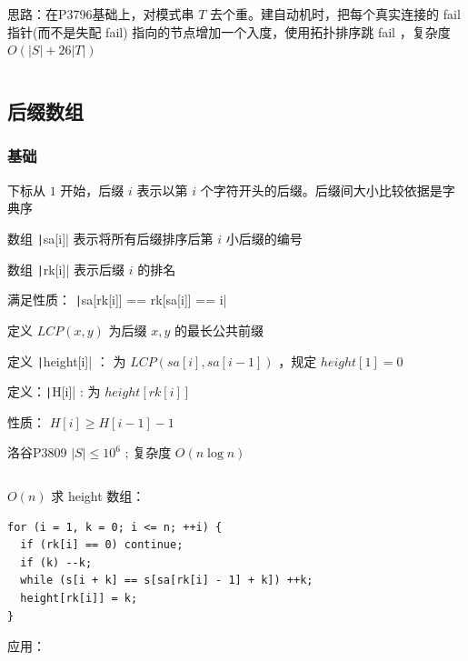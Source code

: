 \documentclass[twocolumn,10pt]{ctexart}
\begin{document}
思路：在P3796基础上，对模式串 $T$ 去个重。建自动机时，把每个真实连接的 fail 指针(而不是失配 fail) 指向的节点增加一个入度，使用拓扑排序跳 fail ，复杂度 $O(|S|+26|T|)$

\inputminted{cpp}{code/p5357_ac_automaton.cpp}

\subsection{后缀数组}

\subsubsection{基础}

下标从 $1$ 开始，后缀 $i$ 表示以第 $i$ 个字符开头的后缀。后缀间大小比较依据是字典序

数组 \texttt|sa[i]| 表示将所有后缀排序后第 $i$ 小后缀的编号

数组 \texttt|rk[i]| 表示后缀 $i$ 的排名

满足性质： \texttt|sa[rk[i]] == rk[sa[i]] == i|

定义 $LCP(x,y)$ 为后缀 $x,y$ 的最长公共前缀

定义 \texttt|height[i]| ： 为 $LCP(sa[i],sa[i-1])$ ，规定 $height[1]=0$

定义：\texttt|H[i]| : 为 $height[rk[i]]$

性质： $H[i]\ge H[i-1]-1$

洛谷P3809 $|S|\le10^6$ ; 复杂度 $O(n\log n)$

\inputminted{cpp}{code/p3809_suffix_array.cpp}

$O(n)$ 求 height 数组：

\begin{verbatim}
for (i = 1, k = 0; i <= n; ++i) {
  if (rk[i] == 0) continue;
  if (k) --k;
  while (s[i + k] == s[sa[rk[i] - 1] + k]) ++k;
  height[rk[i]] = k;
}
\end{verbatim}

应用：
\end{document}
